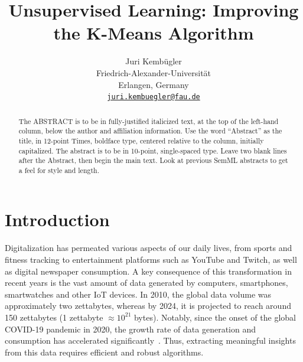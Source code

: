 \documentclass[10pt,twocolumn,letterpaper]{article}
\begin{document}
\title{Unsupervised Learning: Improving the K-Means Algorithm}

\author{Juri Kembügler\\
Friedrich-Alexander-Universität\\
Erlangen, Germany\\
{\tt\small\href{mailto:juri.kembuegler@fau.de}{juri.kembuegler@fau.de}}
}

\maketitle

\begin{abstract}
    The ABSTRACT is to be in fully-justified italicized text, at the top
    of the left-hand column, below the author and affiliation
    information. Use the word ``Abstract'' as the title, in 12-point
    Times, boldface type, centered relative to the column, initially
    capitalized. The abstract is to be in 10-point, single-spaced type.
    Leave two blank lines after the Abstract, then begin the main text.
    Look at previous SemML abstracts to get a feel for style and length.
\end{abstract}


\section{Introduction}\label{sec:introduction}

Digitalization has permeated various aspects of our daily lives, from sports
and fitness tracking to entertainment platforms such as YouTube and Twitch, as
well as digital newspaper consumption. A key consequence of this transformation
in recent years is the vast amount of data generated by computers, smartphones,
smartwatches and other IoT devices. In 2010, the global data volume was
approximately two zettabytes, whereas by 2024, it is projected to reach around
150 zettabytes (1 zettabyte $\approx10^{21}$ bytes). Notably, since the onset
of the global COVID-19 pandemic in 2020, the growth rate of data generation and
consumption has accelerated significantly~\cite{IDC_Statista_2024}. Thus,
extracting meaningful insights from this data requires efficient and robust
algorithms.
\end{document}
